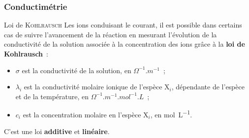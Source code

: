 \documentclass[../main/main.tex]{subfiles}
\begin{document}
\subsubsection{Conductimétrie}
\begin{loi}[label=loi:kohlrausch]{Loi de \textsc{Kohlrausch}}
    Les ions conduisant le courant, il est possible dans certains cas de suivre
    l'avancement de la réaction en mesurant l'évolution de la conductivité de la
    solution associée à la concentration des ions grâce à la \textbf{loi de
    Kohlrausch}~:
    \vspace{-12pt}
    \begin{itemize}
        \item $\sigma$ est la conductivité de la solution, en
            $\si{\Omega^{-1}.m^{-1}}$~;
        \item $\lambda_i$ est la conductivité molaire ionique de l'espèce X$_i$,
            dépendante de l'espèce et de la température, en
            $\si{\Omega^{-1}.m^{-1}.mol^{-1}.L}$~;
        \item $c_i$ est la concentration molaire en l'espèce X$_i$, en
            \si{mol.L^{-1}}.
    \end{itemize}
    \begin{center}
        C'est une loi \textbf{additive} et \textbf{linéaire}.
    \end{center}
\end{loi}
\end{document}
